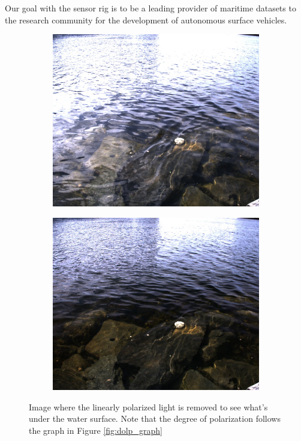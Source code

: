 Our goal with the sensor rig is to be a leading provider of maritime datasets to the research community for the development of autonomous surface vehicles.

\begin{figure}[H]
    \begin{subfigure}[T]{.49\textwidth}
        \includegraphics[width=\textwidth]{figures/pictures/img_4722_s0.jpg}
    \end{subfigure} \hfill
    \begin{subfigure}[T]{.49\textwidth}
        \includegraphics[width=\textwidth]{figures/pictures/img_4722_unpol.jpg}
    \end{subfigure}
    \caption{Image where the linearly polarized light is removed to see what's under the water surface. 
    Note that the degree of polarization follows the graph in Figure \ref{fig:dolp_graph}}
\end{figure}
\vspace{-.5cm}

